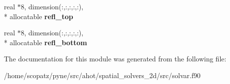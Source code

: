 \begin{DoxyCompactItemize}
\item 
\hypertarget{classsolvar_af29eb10335c7759fed480c446ebfc589}{real $\ast$8, dimension(\-:,\-:,\-:,\-:,\-:), \\*
allocatable {\bfseries refl\-\_\-top}}\label{classsolvar_af29eb10335c7759fed480c446ebfc589}

\item 
\hypertarget{classsolvar_a5ce62c4bd849dd94ecdcea30ff3de1be}{real $\ast$8, dimension(\-:,\-:,\-:,\-:,\-:), \\*
allocatable {\bfseries refl\-\_\-bottom}}\label{classsolvar_a5ce62c4bd849dd94ecdcea30ff3de1be}

\end{DoxyCompactItemize}


The documentation for this module was generated from the following file\-:\begin{DoxyCompactItemize}
\item 
/home/scopatz/pyne/src/ahot/spatial\-\_\-solvers\-\_\-2d/src/solvar.\-f90\end{DoxyCompactItemize}
